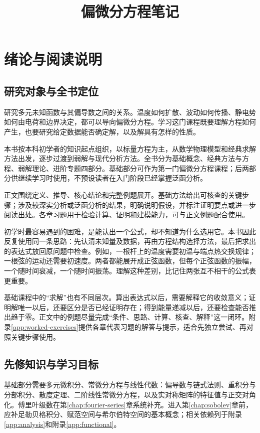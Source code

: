 \documentclass[UTF8,12pt,a4paper,fontset=fandol]{ctexbook}
\title{偏微分方程笔记}
\author{}
\date{}
\begin{document}
\frontmatter
\maketitle
\tableofcontents

\chapter{绪论与阅读说明}
\label{chap:roadmap}

\section{研究对象与全书定位}

研究多元未知函数与其偏导数之间的关系。温度如何扩散、波动如何传播、静电势如何由电荷和边界决定，都可以导向偏微分方程。学习这门课程既要理解方程如何产生，也要研究给定数据能否确定解，以及解具有怎样的性质。

本书按本科初学者的知识起点组织，以标量方程为主，从数学物理模型和经典求解方法出发，逐步过渡到弱解与现代分析方法。全书分为基础概念、经典方法与方程、弱解理论、进阶专题四部分。基础部分可作为第一门偏微分方程课程；后两部分供继续学习时使用，不预设读者在入门阶段已经掌握泛函分析。

正文围绕定义、推导、核心结论和完整例题展开。基础方法给出可核查的关键步骤；涉及较深实分析或泛函分析的结果，明确说明假设，并标注证明要点或进一步阅读出处。各章习题用于检验计算、证明和建模能力，可与正文例题配合使用。

初学时最容易遇到的困难，是能认出一个公式，却不知道为什么选用它。本书因此反复使用同一条思路：先认清未知量及数据，再由方程结构选择方法，最后把求出的表达式放回原问题中检查。例如，一根杆上的温度需要初温与端点热交换规律；一根弦的运动还需要初速度。两者都能展开成正弦函数，但每个正弦函数的振幅，一个随时间衰减，一个随时间振荡。理解这种差别，比记住两张互不相干的公式表更重要。

基础课程中的“求解”也有不同层次。算出表达式以后，需要解释它的收敛意义；证明解唯一以后，还要区分是否已经证明存在；得到能量递减以后，还要检查能否推出趋于零。正文中的例题尽量完成“条件、思路、计算、核查、解释”这一闭环。附录\ref{app:worked-exercises}提供各章代表习题的解答与提示，适合先独立尝试、再对照关键步骤使用。

\section{先修知识与学习目标}

基础部分需要多元微积分、常微分方程与线性代数：偏导数与链式法则、重积分与分部积分、散度定理、二阶线性常微分方程，以及实对称矩阵的特征值与正交对角化。傅里叶级数在第\ref{chap:fourier-series}章系统补充。进入第\ref{chap:sobolev}章前，应补足勒贝格积分、赋范空间与希尔伯特空间的基本概念；相关依赖列于附录\ref{app:analysis}和附录\ref{app:functional}。
\end{document}
